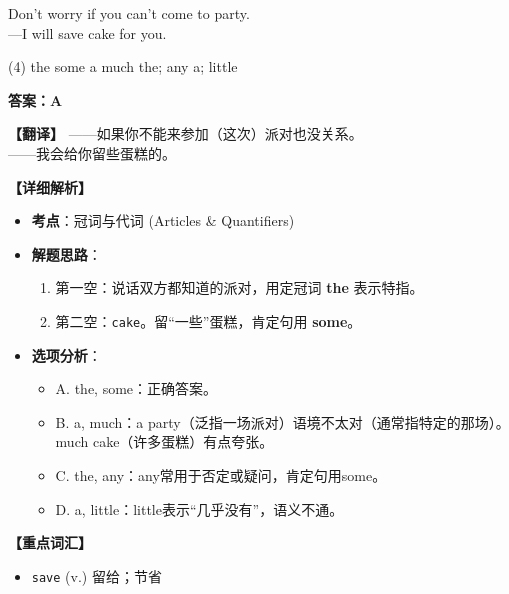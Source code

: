 \documentclass[11pt, a4paper]{article}
\newcommand{\analysis}[4]{
    \begin{solutionbox}
        \textbf{答案：#1}
        
        \textbf{【翻译】} #2
        
        \textbf{【详细解析】}
        #3
        
        \textbf{【重点词汇】}
        #4
    \end{solutionbox}
}
\newcommand{\blank}{\underline{\hspace{1.5cm}}}
\begin{document}
\begin{questions}
    \item Don't worry if you can't come to \blank party. \\
    ---I will save \blank cake for you.
    \begin{tasks}(4)
        \task the some \task a much \task the; any \task a; little
    \end{tasks}
    \analysis{A}{——如果你不能来参加（这次）派对也没关系。\\——我会给你留些蛋糕的。}{
        \begin{itemize}
            \item \textbf{考点}：冠词与代词 (Articles \& Quantifiers)
            \item \textbf{解题思路}：
                \begin{enumerate}
                    \item 第一空：说话双方都知道的派对，用定冠词 \textbf{the} 表示特指。
                    \item 第二空：\texttt{cake}。留“一些”蛋糕，肯定句用 \textbf{some}。
                \end{enumerate}
            \item \textbf{选项分析}：
                \begin{itemize}
                    \item A. the, some：正确答案。
                    \item B. a, much：a party（泛指一场派对）语境不太对（通常指特定的那场）。much cake（许多蛋糕）有点夸张。
                    \item C. the, any：any常用于否定或疑问，肯定句用some。
                    \item D. a, little：little表示“几乎没有”，语义不通。
                \end{itemize}
        \end{itemize}
    }{
        \begin{itemize}
            \item \texttt{save} (v.) 留给；节省
        \end{itemize}
    }


\end{questions}
\end{document}
